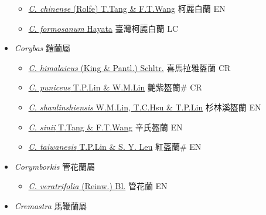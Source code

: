\begin{itemize}
  \begin{itemize}
        \item[] \href{http://www.theplantlist.org/tpl1.1/search?q=Collabium+chinense}{\textit{C. chinense} (Rolfe) T.Tang \& F.T.Wang}   柯麗白蘭 EN
        \item[] \href{http://www.theplantlist.org/tpl1.1/search?q=Collabium+formosanum}{\textit{C. formosanum} Hayata}   臺灣柯麗白蘭 LC
  \end{itemize}
 \item[] \textit{Corybas} 鎧蘭屬
                    
  \begin{itemize}
        \item[] \href{http://www.theplantlist.org/tpl1.1/search?q=Corybas+himalaicus}{\textit{C. himalaicus} (King \& Pantl.) Schltr.}   喜馬拉雅盔蘭 CR
        \item[] \href{http://www.theplantlist.org/tpl1.1/search?q=Corybas+puniceus}{\textit{C. puniceus} T.P.Lin \& W.M.Lin}   艷紫盔蘭\# CR
        \item[] \href{http://www.theplantlist.org/tpl1.1/search?q=Corybas+shanlinshiensis}{\textit{C. shanlinshiensis} W.M.Lin, T.C.Hsu \& T.P.Lin}     杉林溪盔蘭 EN
        \item[] \href{http://www.theplantlist.org/tpl1.1/search?q=Corybas+sinii}{\textit{C. sinii} T.Tang \& F.T.Wang}   辛氏盔蘭 EN
        \item[] \href{http://www.theplantlist.org/tpl1.1/search?q=Corybas+taiwanesis}{\textit{C. taiwanesis} T.P.Lin \& S. Y. Leu}   紅盔蘭\# EN
  \end{itemize}
 \item[] \textit{Corymborkis} 管花蘭屬
                    
  \begin{itemize}
        \item[] \href{http://www.theplantlist.org/tpl1.1/search?q=Corymborkis+veratrifolia}{\textit{C. veratrifolia} (Reinw.) Bl.}   管花蘭 EN
  \end{itemize}
 \item[] \textit{Cremastra} 馬鞭蘭屬
                    

\end{itemize}
